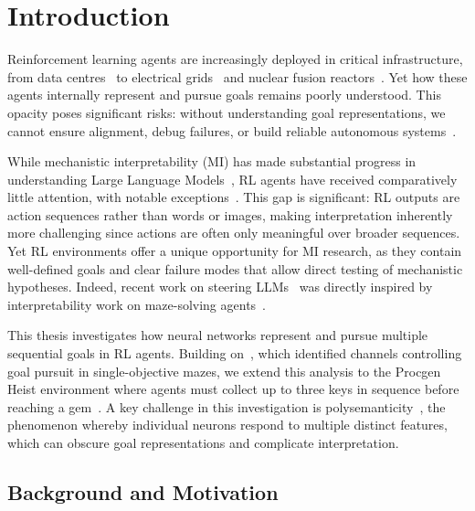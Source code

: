 \chapter{Introduction}\label{ch:introduction}

Reinforcement learning agents are increasingly deployed in critical infrastructure, from data centres~\citep{luo_2022_controlling} to electrical grids~\citep{nakabi_2021_deep} and nuclear fusion reactors~\citep{Degrave_2022_Nature_Fusion}. Yet how these agents internally represent and pursue goals remains poorly understood. This opacity poses significant risks: without understanding goal representations, we cannot ensure alignment, debug failures, or build reliable autonomous systems~\citep{Amodei_2016_AISafety}.

While mechanistic interpretability (MI) has made substantial progress in understanding Large Language Models~\citep{elhage2021mathematical, wang_2022_interpretability, olsson_2022_incontext, mcdougall_2023_copy}, RL agents have received comparatively little attention, with notable exceptions~\citep{hilton_2020_understanding, atrey_2020_exploratory}. This gap is significant: RL outputs are action sequences rather than words or images, making interpretation inherently more challenging since actions are often only meaningful over broader sequences. Yet RL environments offer a unique opportunity for MI research, as they contain well-defined goals and clear failure modes that allow direct testing of mechanistic hypotheses. Indeed, recent work on steering LLMs~\citep{turner_2024_activation} was directly inspired by interpretability work on maze-solving agents~\citep{mini_2023_understanding}.

This thesis investigates how neural networks represent and pursue multiple sequential goals in RL agents. Building on~\citet{mini_2023_understanding}, which identified channels controlling goal pursuit in single-objective mazes, we extend this analysis to the Procgen Heist environment where agents must collect up to three keys in sequence before reaching a gem~\citep{cobbe_2020_leveraging}. A key challenge in this investigation is polysemanticity~\citep{elhage2022superposition}, the phenomenon whereby individual neurons respond to multiple distinct features, which can obscure goal representations and complicate interpretation.

\section{Background and Motivation}\label{sec:background}

